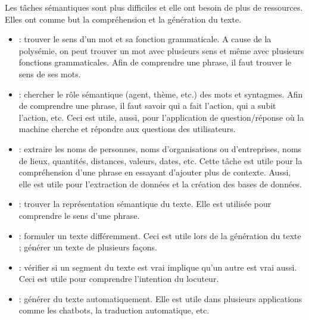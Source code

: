 \documentclass{KodeBook}
\begin{document}
Les tâches sémantiques sont plus difficiles et elle ont besoin de plus de ressources. 
Elles ont comme but la compréhension et la génération du texte. 
\begin{itemize}
	\item {} : trouver le sens d'un mot et sa fonction grammaticale. 
	A cause de la polysémie, on peut trouver un mot avec plusieurs sens et même avec plusieurs fonctions grammaticales. 
	Afin de comprendre une phrase, il faut trouver le sens de ses mots.
	\item {} : chercher le rôle sémantique (agent, thème, etc.) des mots et syntagmes.
	Afin de comprendre une phrase, il faut savoir qui a fait l'action, qui a subit l'action, etc. 
	Ceci est utile, aussi, pour l'application de question/réponse où la machine cherche et répondre aux questions des utilisateurs.
	\item {} : extraire les noms de personnes, noms d'organisations ou d'entreprises, noms de lieux, quantités, distances, valeurs, dates, etc. 
	Cette tâche est utile pour la compréhension d'une phrase en essayant d'ajouter plus de contexte. 
	Aussi, elle est utile pour l'extraction de données et la création des bases de données.
	\item {} : trouver la représentation sémantique du texte. 
	Elle est utilisée pour comprendre le sens d'une phrase.
	\item {} : formuler un texte différemment. 
	Ceci est utile lors de la génération du texte ; générer un texte de plusieurs façons.
	\item {} : vérifier si un segment du texte est vrai implique qu'un autre est vrai aussi.
	Ceci est utile pour comprendre l'intention du locuteur.
	\item {} : générer du texte automatiquement. 
	Elle est utile dans plusieurs applications comme les chatbots, la traduction automatique, etc.
\end{itemize}
\end{document}
